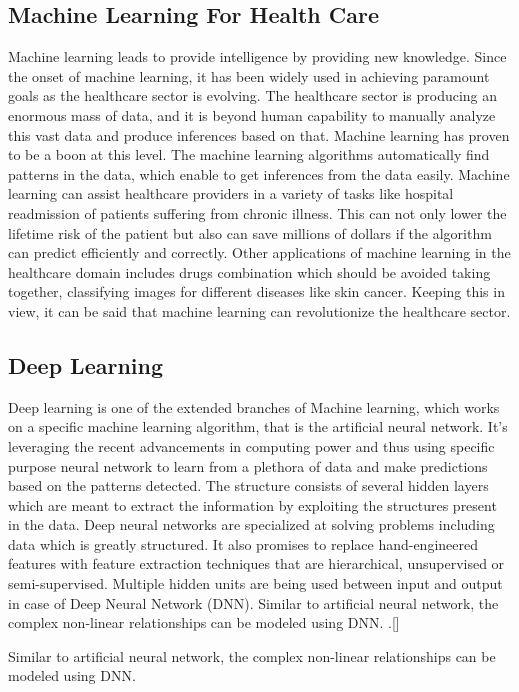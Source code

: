 \documentclass[12pt,a4paper]{article}
\begin{document}
\subsection{Machine Learning For Health Care}
Machine learning leads to provide intelligence by providing new knowledge. Since
the onset of machine learning, it has been widely used in achieving paramount goals as the
healthcare sector is evolving. The healthcare sector is producing an enormous mass of data, and it
is beyond human capability to manually analyze this vast data and produce inferences based on
that. Machine learning has proven to be a boon at this level. The machine learning algorithms
automatically find patterns in the data, which enable to get inferences from the data easily. Machine
learning can assist healthcare providers in a variety of tasks like hospital readmission of patients
suffering from chronic illness. This can not only lower the lifetime risk of the patient but also can save
millions of dollars if the algorithm can predict efficiently and correctly. Other applications of
machine learning in the healthcare domain includes drugs combination which should be avoided
taking together, classifying images for different diseases like skin cancer. Keeping this in view, it
can be said that machine learning can revolutionize the healthcare sector.
\subsection{Deep Learning}
Deep learning is one of the extended branches of Machine learning, which works on a specific
machine learning algorithm, that is the artificial neural network. It's leveraging the recent
advancements in computing power and thus using specific purpose neural network to learn from a plethora of data and make predictions based on the patterns detected. The structure
consists of several hidden layers which are meant to extract the information by exploiting the
structures present in the data. Deep neural networks are specialized at solving problems including
data which is greatly structured. It also promises to replace hand-engineered features
with feature extraction techniques that are hierarchical, unsupervised or semi-supervised. Multiple
hidden units are being used between input and output in case of Deep Neural Network (DNN).
Similar to artificial neural network, the complex non-linear relationships can be modeled using
DNN.
.[]

Similar to artificial neural network, the complex non-linear relationships can be modeled using
DNN.
\end{document}
